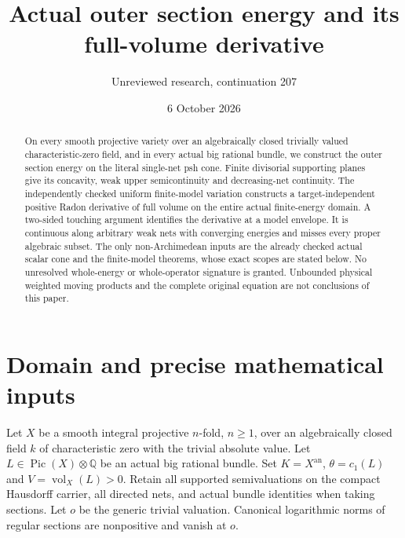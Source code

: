 \documentclass[11pt]{article}
\title{Actual outer section energy and its full-volume derivative}
\author{Unreviewed research, continuation 207}
\date{6 October 2026}
\newcommand{\vol}{\operatorname{vol}}
\begin{document}
\maketitle
\begin{abstract}
On every smooth projective variety over an algebraically closed
trivially valued characteristic-zero field, and in every actual big
rational bundle, we construct the outer section energy on the literal
single-net psh cone. Finite divisorial supporting planes give its
concavity, weak upper semicontinuity and decreasing-net continuity.
The independently checked uniform finite-model variation constructs
a target-independent positive Radon derivative of full volume on
the entire actual finite-energy domain. A two-sided touching argument
identifies the derivative at a model envelope. It is continuous along
arbitrary weak nets with converging energies and misses every proper
algebraic subset. The only non-Archimedean inputs are the already
checked actual scalar cone and the finite-model theorems, whose exact
scopes are stated below. No unresolved whole-energy or whole-operator
signature is granted. Unbounded physical weighted moving products
and the complete original equation are not conclusions of this paper.
\end{abstract}

\section{Domain and precise mathematical inputs}
Let $X$ be a smooth integral projective $n$-fold, $n\geq1$, over
an algebraically closed field $k$ of characteristic zero with the
trivial absolute value. Let $L\in\operatorname{Pic}(X)\otimes\mathbb Q$
be an actual big rational bundle. Set
$K=X^{\mathrm{an}}$, $\theta=c_1(L)$ and $V=\vol_X(L)>0$.
Retain all supported semivaluations on the compact Hausdorff carrier,
all directed nets, and actual bundle identities when taking sections.
Let $o$ be the generic trivial valuation. Canonical logarithmic norms
of regular sections are nonpositive and vanish at $o$.
\end{document}
